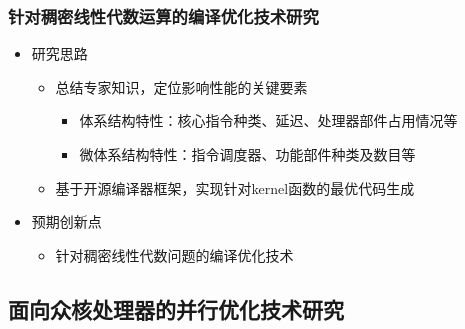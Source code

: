 \documentclass[aspectratio=169]{beamer}
\begin{document}
\begin{frame}
  \frametitle{针对稠密线性代数运算的编译优化技术研究}
  \begin{itemize}
  \item 研究思路
    \begin{itemize}
    \item 总结专家知识，定位影响性能的关键要素
      \begin{itemize}
      \item 体系结构特性：核心指令种类、延迟、处理器部件占用情况等
      \item 微体系结构特性：指令调度器、功能部件种类及数目等
      \end{itemize}
    \item 基于开源编译器框架，实现针对kernel函数的最优代码生成
    \end{itemize}
  \item 预期创新点
    \begin{itemize}
    \item 针对稠密线性代数问题的编译优化技术
    \end{itemize}
  \end{itemize}
\end{frame}

\subsection[并行可扩展性研究]{面向众核处理器的并行优化技术研究}
\end{document}
